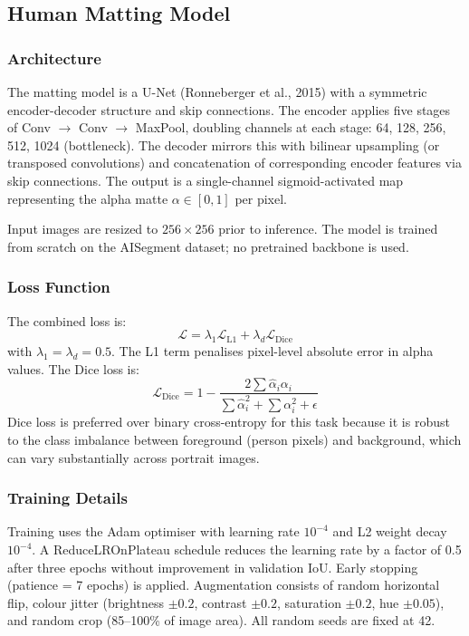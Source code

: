 \subsection{Human Matting Model}

\subsubsection{Architecture}

The matting model is a U-Net (Ronneberger et al., 2015) with a symmetric
encoder-decoder structure and skip connections. The encoder applies five stages of
Conv $\to$ Conv $\to$ MaxPool, doubling channels at each stage: 64, 128, 256, 512,
1024 (bottleneck). The decoder mirrors this with bilinear upsampling (or transposed
convolutions) and concatenation of corresponding encoder features via skip connections.
The output is a single-channel sigmoid-activated map representing the alpha matte
$\alpha \in [0, 1]$ per pixel.

Input images are resized to $256 \times 256$ prior to inference. The model is trained
from scratch on the AISegment dataset; no pretrained backbone is used.

\subsubsection{Loss Function}

The combined loss is:
\begin{equation}
  \mathcal{L} = \lambda_1 \mathcal{L}_{\text{L1}} + \lambda_d \mathcal{L}_{\text{Dice}}
\end{equation}
with $\lambda_1 = \lambda_d = 0.5$. The L1 term penalises pixel-level absolute error
in alpha values. The Dice loss is:
\begin{equation}
  \mathcal{L}_{\text{Dice}} = 1 - \frac{2\sum \hat{\alpha}_i \alpha_i}{\sum \hat{\alpha}_i^2 + \sum \alpha_i^2 + \epsilon}
\end{equation}
Dice loss is preferred over binary cross-entropy for this task because it is robust to
the class imbalance between foreground (person pixels) and background, which can vary
substantially across portrait images.

\subsubsection{Training Details}

Training uses the Adam optimiser with learning rate $10^{-4}$ and L2 weight decay
$10^{-4}$. A ReduceLROnPlateau schedule reduces the learning rate by a factor of 0.5
after three epochs without improvement in validation IoU. Early stopping (patience = 7
epochs) is applied. Augmentation consists of random horizontal flip, colour jitter
(brightness $\pm0.2$, contrast $\pm0.2$, saturation $\pm0.2$, hue $\pm0.05$), and
random crop (85--100\% of image area). All random seeds are fixed at 42.

